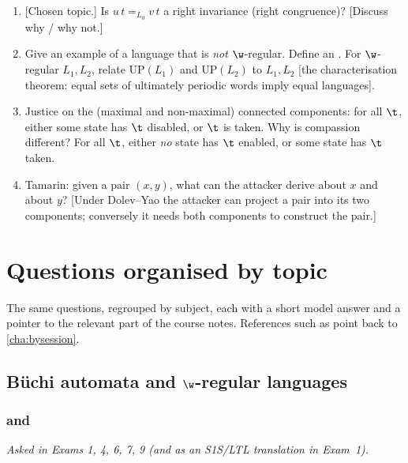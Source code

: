 \documentclass[oneside]{academica}
\begin{document}
\begin{enumerate}
  \item {}[Chosen topic.] Is $u\,t =_{L_0} v\,t$ a right invariance (right
    congruence)? [Discuss why / why not.]
  \item Give an example of a language that is \emph{not} $\w$-regular.
    Define an . For $\w$-regular $L_1,
    L_2$, relate $\mathrm{UP}(L_1)$ and $\mathrm{UP}(L_2)$ to $L_1,L_2$
    [the characterisation theorem: equal sets of ultimately periodic
    words imply equal languages].
  \item Justice on the (maximal and non-maximal) connected components: for
    all $\t$, either some state has $\t$ disabled, or $\t$ is taken. Why
    is compassion different? For all $\t$, either \emph{no} state has
    $\t$ enabled, or some state has $\t$ taken.
  \item Tamarin: given a pair $(x,y)$, what can the attacker derive about
    $x$ and about $y$? [Under Dolev--Yao the attacker can project a pair
    into its two components; conversely it needs both components to
    construct the pair.]
\end{enumerate}

\chapter{Questions organised by topic}\label{cha:bytopic}

The same questions, regrouped by subject, each with a short model answer
and a pointer to the relevant part of the course notes. References such
as  point back to \autoref{cha:bysession}.

\section{Büchi automata and \texorpdfstring{$\w$}{omega}-regular languages}

\subsection{ and }
\emph{Asked in Exams 1, 4, 6, 7, 9 (and as an S1S/LTL translation in
Exam~1).}
\end{document}
